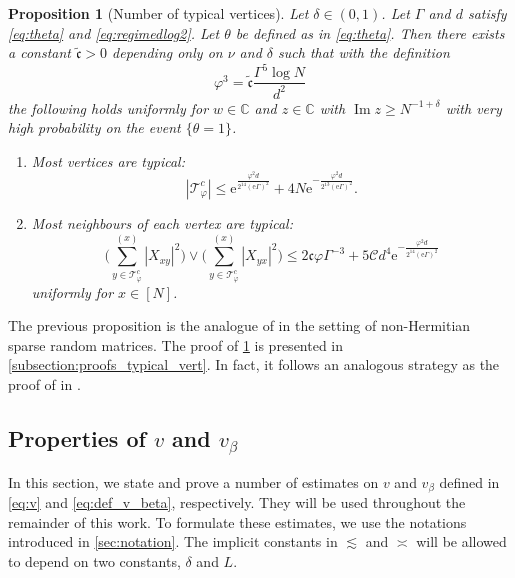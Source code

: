 \documentclass[10pt,a4paper]{amsart}
\DeclareMathOperator{\Ima}{Im}
\newcommand{\ee}{\mathrm{e}}
\newcommand{\abs}[1]{\left| #1 \right|}
\newcommand{\C}{\mathbb{C}}
\newcommand{\ccc}{\mathfrak{c}}
\renewcommand{\Im}{\Ima}
\newtheorem{prop}{Proposition}[section]
\numberwithin{equation}{section}
\begin{document}
	
	\begin{prop}[Number of typical vertices] \label{prop:mostverticesandneigharetypical}
Let $\delta \in (0,1)$. Let $\Gamma$ and $d$ satisfy \cref{eq:theta} and \eqref{eq:regimedlog2}. Let $\theta$ be defined as in \eqref{eq:theta}. Then there exists a constant $\tilde{\ccc}>0$ depending only on $\nu$ and $\delta$ such that with the definition 
   \begin{equation}\label{eq:new_varphi}
 \varphi^3  = \tilde{\ccc} \frac{\Gamma^5 \log N}{d^2}
		 \end{equation}
  the following holds uniformly for $w \in \C$ and $z \in \C$ with $\Im z \geq N^{-1 + \delta}$  with very high probability on the event $\{\theta =1\}$.
		\begin{enumerate}[label=(\roman*)]
			\item \label{mostverticestypical} Most vertices are typical:
			\begin{equation*}
				\abs{\mathcal{T}_{\varphi}^c} \le \ee^{\frac{\varphi^2d}{2^{14} (\ee\Gamma)^2}}  + 4N \ee^{-\frac{\varphi^2d}{2^{13} (\ee\Gamma)^2}} .
			\end{equation*}
			\item \label{mostneighboursaretypical} Most neighbours of each vertex are typical:
			\begin{equation*}
				\Biggl(\sum_{y\in \mathcal{T}^c_{\varphi}}^{(x)} \abs{X_{xy}}^2\Biggr) \vee \Biggl(\sum_{y\in \mathcal{T}^c_{\varphi}}^{(x)} \abs{X_{yx}}^2 \Biggr)\le 2 \ccc \varphi\Gamma^{-3} + 5\mathcal{C}d^4\ee^{-\frac{\varphi^2d}{2^{14} (\ee\Gamma)^2}}
			\end{equation*}
			uniformly for $x \in [N]$.  
		\end{enumerate}
	\end{prop}

		The previous proposition is the analogue of \cite[Proposition 4.8]{alt2021delocalization} 
		in the setting of non-Hermitian sparse random matrices. The proof of \cref{prop:mostverticesandneigharetypical} is presented in \cref{subsection:proofs_typical_vert}. In fact, it follows an analogous  strategy as the proof of \cite[Proposition~4.8]{alt2021delocalization} in   \cite[Section~4.2]{alt2021delocalization}.
	
	\subsection{Properties of $v$ and $v_\beta$}\label{section:properties_v_v_beta}
	
	In this section, we state and prove a number of estimates on $v$ and $v_\beta$ 
	defined in \cref{eq:v} and \cref{eq:def_v_beta}, respectively. 
	They will be used throughout the remainder of this work. 
	 To formulate these estimates, we use the notations introduced in \cref{sec:notation}.  
	 The implicit constants in $\lesssim$ and $\asymp$ will be allowed to depend on two constants, $\delta$ and $L$.  
	
\end{document}
